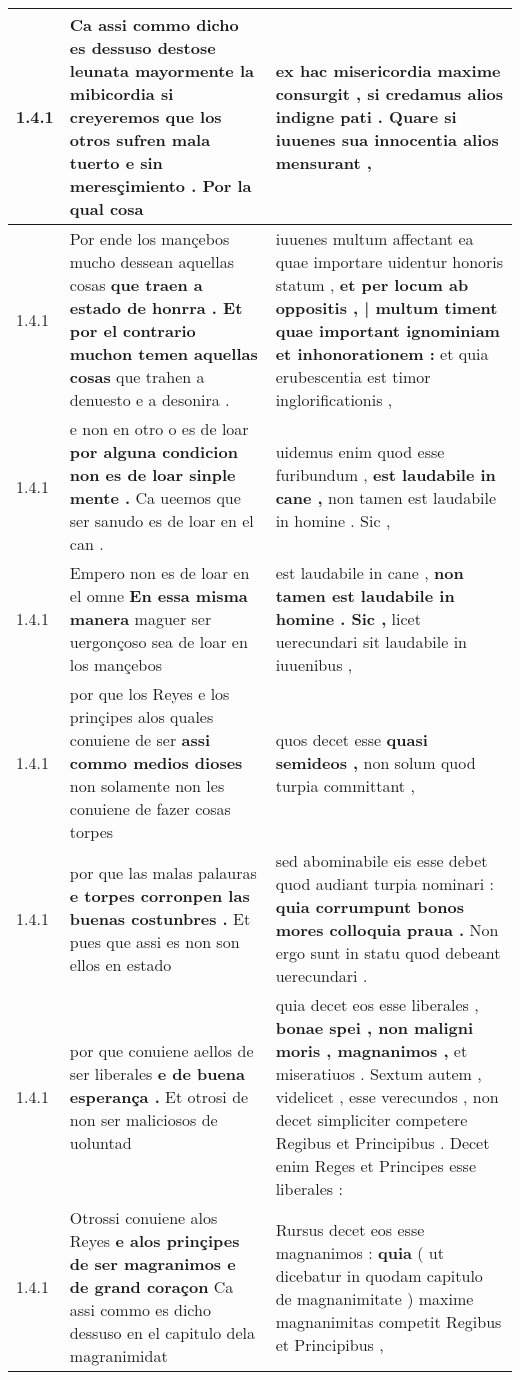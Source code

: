 \begin{tabular}{|p{1cm}|p{6.5cm}|p{6.5cm}|}
1.4.1 & Ca assi commo dicho es dessuso destose leunata mayormente la mibicordia \textbf{ si creyeremos que los otros sufren mala tuerto e sin meresçimiento . } Por la qual cosa & ex hac misericordia maxime consurgit , \textbf{ si credamus alios indigne pati . } Quare si iuuenes sua innocentia alios mensurant , \\\hline
1.4.1 & Por ende los mançebos mucho dessean aquellas cosas \textbf{ que traen a estado de honrra . Et por el contrario muchon temen aquellas cosas } que trahen a denuesto e a desonira . & iuuenes multum affectant ea quae importare uidentur honoris statum , \textbf{ et per locum ab oppositis , | multum timent quae important ignominiam et inhonorationem : } et quia erubescentia est timor inglorificationis , \\\hline
1.4.1 & e non en otro o es de loar \textbf{ por alguna condicion non es de loar sinple mente . } Ca ueemos que ser sanudo es de loar en el can . & uidemus enim quod esse furibundum , \textbf{ est laudabile in cane , } non tamen est laudabile in homine . Sic , \\\hline
1.4.1 & Empero non es de loar en el omne \textbf{ En essa misma manera } maguer ser uergonçoso sea de loar en los mançebos & est laudabile in cane , \textbf{ non tamen est laudabile in homine . Sic , } licet uerecundari sit laudabile in iuuenibus , \\\hline
1.4.1 & por que los Reyes e los prinçipes alos quales conuiene de ser \textbf{ assi commo medios dioses } non solamente non les conuiene de fazer cosas torpes & quos decet esse \textbf{ quasi semideos , } non solum quod turpia committant , \\\hline
1.4.1 & por que las malas palauras \textbf{ e torpes corronpen las buenas costunbres . } Et pues que assi es non son ellos en estado & sed abominabile eis esse debet quod audiant turpia nominari : \textbf{ quia corrumpunt bonos mores colloquia praua . } Non ergo sunt in statu quod debeant uerecundari . \\\hline
1.4.1 & por que conuiene aellos de ser liberales \textbf{ e de buena esperança . } Et otrosi de non ser maliciosos de uoluntad & quia decet eos esse liberales , \textbf{ bonae spei , non maligni moris , magnanimos , } et miseratiuos . Sextum autem , videlicet , esse verecundos , non decet simpliciter competere Regibus et Principibus . Decet enim Reges et Principes esse liberales : \\\hline
1.4.1 & Otrossi conuiene alos Reyes \textbf{ e alos prinçipes de ser magranimos e de grand coraçon } Ca assi commo es dicho dessuso en el capitulo dela magranimidat & Rursus decet eos esse magnanimos : \textbf{ quia } ( ut dicebatur in quodam capitulo de magnanimitate ) maxime magnanimitas competit Regibus et Principibus , \\\hline

\end{tabular}
